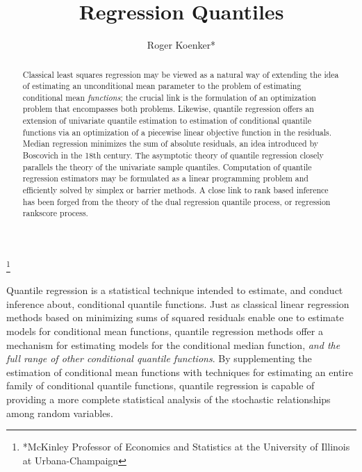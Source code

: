 \documentclass{amsart}
\begin{document}
\title{\sc  Regression Quantiles }



\author{\sc Roger Koenker*}
\thanks{*McKinley Professor of Economics and Statistics at the
University of Illinois at Urbana-Champaign}

\begin{abstract}
Classical least squares regression may be viewed as a
natural way of extending the idea of estimating an unconditional
mean parameter to the problem of estimating conditional mean {\it functions};
the crucial link is the formulation of an optimization problem
that encompasses both problems.  Likewise, quantile regression
offers an extension of univariate quantile estimation to estimation
of conditional quantile functions via an optimization of
a piecewise linear objective function in the residuals.  Median
regression minimizes the sum of absolute residuals, an idea introduced
by Boscovich in the 18th century. The asymptotic theory of quantile regression closely parallels the
theory of the univariate sample quantiles. Computation
of quantile regression estimators may be formulated as a linear
programming problem and efficiently solved by simplex or
barrier methods.  A close link to rank based inference has been
forged from the theory of the dual regression quantile process,
or regression rankscore process.
\end{abstract}

\maketitle

Quantile regression is a statistical technique intended to estimate,
and conduct inference about, conditional quantile functions. 
Just as classical linear regression methods based on
minimizing sums of squared residuals enable one to estimate models for
conditional mean functions, quantile regression methods offer a mechanism
for estimating models for the conditional median function, {\it and the full
range of other conditional quantile functions}.
By supplementing the estimation of conditional mean functions with
techniques for estimating an entire family of conditional quantile
functions, quantile regression is capable of providing a more
complete statistical analysis of the stochastic relationships among
random variables.
\end{document}
